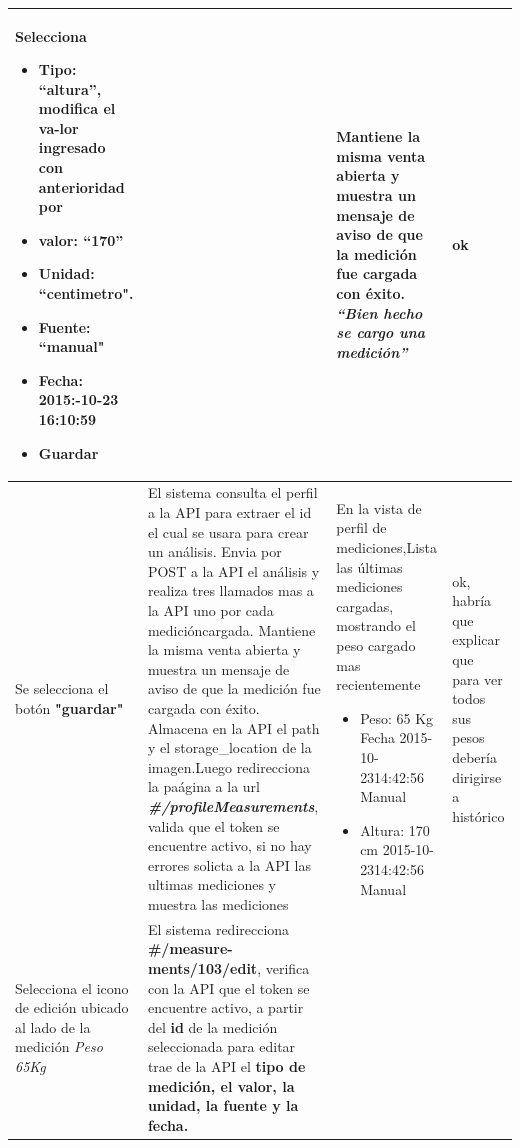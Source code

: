 \documentclass[a4paper,12pt]{article}
\begin{document}
\begin{longtable}{|p{4cm}|p{4cm}|p{4cm}|p{3cm}|}
Selecciona



\begin{itemize}
	\item \textbf{Tipo:} ``altura'', modifica el va-lor ingresado con anterioridad
	por
	\item \textbf{valor: }``170''
	\item \textbf{Unidad:} ``centimetro".
	\item \textbf{Fuente: }``manual"
	\item \textbf{Fecha: }2015:-10-23 16:10:59
	\item \textbf{ Guardar}
\end{itemize}
&
&
Mantiene la misma venta abierta y muestra un mensaje de aviso de que
la medición fue cargada con éxito.\textit{\textbf{ ``Bien hecho se cargo una medición''}}
& ok
\\ \hline




Se selecciona el botón \textbf{"guardar"}
& El sistema consulta el perfil a la API para extraer el id el cual se usara para crear un análisis. Envia por POST a la API el análisis y realiza tres llamados mas a la API uno por cada medicióncargada.
Mantiene la misma venta abierta y muestra un mensaje de aviso de que
la medición fue cargada con éxito. Almacena en la API el path y el storage\_location de la imagen.Luego redirecciona la paágina a la url
\textit{\textbf{\#/profileMeasurements}}, valida que el token se encuentre activo, si no hay
errores solicta a la API las ultimas mediciones y muestra las mediciones

& En la vista de perfil de mediciones,Lista las últimas mediciones cargadas,
mostrando el peso cargado mas recientemente

\begin{itemize}
	\item Peso: 65 Kg Fecha 2015-10-2314:42:56 Manual
	\item Altura: 170 cm 2015-10-2314:42:56 Manual

\end{itemize}
& ok, habría que explicar que para ver todos sus pesos debería dirigirse a histórico

\\ \hline






Selecciona el icono de edición ubicado al lado de la medición \textit{Peso 65Kg}
& El sistema redirecciona \textbf{\#/measure-ments/103/edit}, verifica con la API que el token se encuentre activo, a partir del\textbf{ id} de la medición seleccionada para editar trae de la API el \textbf{tipo de medición, el valor, la unidad, la fuente y la fecha.}


\end{longtable}
\end{document}
